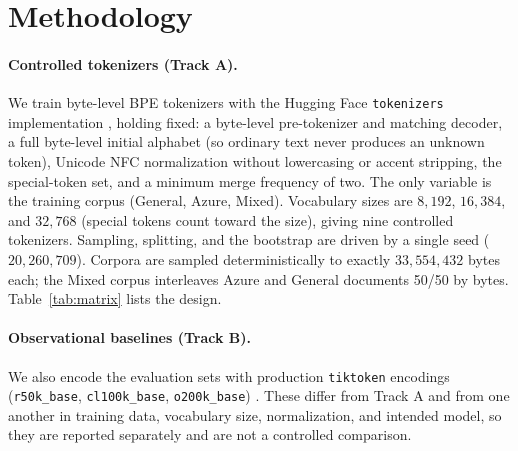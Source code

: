 \section{Methodology}
\label{sec:method}

\paragraph{Controlled tokenizers (Track A).} We train byte-level BPE tokenizers
\citep{radford2019gpt2} with the Hugging Face \texttt{tokenizers} implementation
\citep{huggingface2026tokenizers}, holding fixed: a byte-level pre-tokenizer and
matching decoder, a full byte-level initial alphabet (so ordinary text never
produces an unknown token), Unicode NFC normalization without lowercasing or
accent stripping, the special-token set, and a minimum merge frequency of two.
The only variable is the training corpus (General, Azure, Mixed). Vocabulary sizes
are $8{,}192$, $16{,}384$, and $32{,}768$ (special tokens count toward the size),
giving nine controlled tokenizers. Sampling, splitting, and the bootstrap are
driven by a single seed ($20{,}260{,}709$). Corpora are sampled deterministically
to exactly $33{,}554{,}432$ bytes each; the Mixed corpus interleaves Azure and
General documents 50/50 by bytes. Table~\ref{tab:matrix} lists the design.

\begin{table}[t]
\centering
\caption{Controlled experimental design. Only the training corpus is manipulated;
all other factors are held fixed within a comparison.}
\label{tab:matrix}
\small

\end{table}

\paragraph{Observational baselines (Track B).} We also encode the evaluation sets
with production \texttt{tiktoken} encodings (\texttt{r50k\_base},
\texttt{cl100k\_base}, \texttt{o200k\_base}) \citep{openai2026tiktoken}. These
differ from Track A and from one another in training data, vocabulary size,
normalization, and intended model, so they are reported separately and are not a
controlled comparison.

